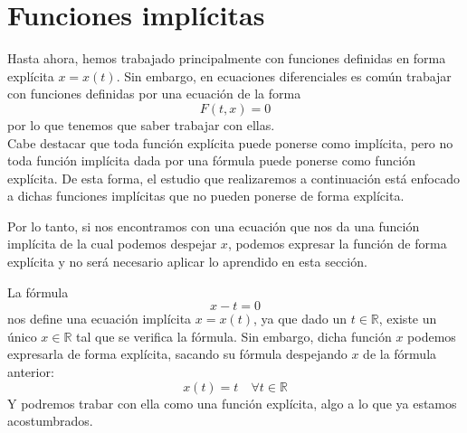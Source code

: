 \section{Funciones implícitas}
Hasta ahora, hemos trabajado principalmente con funciones definidas en forma explícita $x=x(t)$. Sin embargo, en ecuaciones diferenciales es común trabajar con funciones definidas por una ecuación de la forma
\begin{equation*}
    F(t,x) = 0
\end{equation*}
por lo que tenemos que saber trabajar con ellas.\\

Cabe destacar que toda función explícita puede ponerse como implícita, pero no toda función implícita dada por una fórmula puede ponerse como función explícita. De esta forma, el estudio que realizaremos a continuación está enfocado a dichas funciones implícitas que no pueden ponerse de forma explícita.

Por lo tanto, si nos encontramos con una ecuación que nos da una función implícita de la cual podemos despejar $x$, podemos expresar la función de forma explícita y no será necesario aplicar lo aprendido en esta sección.

\begin{ejemplo}
    La fórmula
    \begin{equation*}
        x-t = 0
    \end{equation*}
    nos define una ecuación implícita $x=x(t)$, ya que dado un $t\in \mathbb{R}$, existe un único $x\in \mathbb{R}$ tal que se verifica la fórmula. Sin embargo, dicha función $x$ podemos expresarla de forma explícita, sacando su fórmula despejando $x$ de la fórmula anterior:
    \begin{equation*}
        x(t) = t \quad \forall t\in \mathbb{R}
    \end{equation*}
    Y podremos trabar con ella como una función explícita, algo a lo que ya estamos acostumbrados.
\end{ejemplo}

